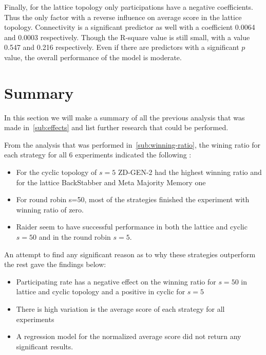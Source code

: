 Finally, for the lattice topology only participations have a negative coefficients.
Thus the only factor with a reverse influence on average score in the lattice topology.
Connectivity is a significant predictor as well with a coefficient 0.0064 and
0.0003 respectively. Though the R-square value is still  small,
with a value 0.547 and 0.216 respectively.
Even if there are predictors with a significant \(p\) value, the overall
performance of the model is moderate.



\section{Summary}
\label{sub:summary}
In this section we will make a summary of all the previous analysis that was made
in~\ref{sub:effects} and list further research that could be performed.

From the analysis that was performed in~\ref{sub:winning-ratio}, the wining ratio
for each strategy for all 6 experiments indicated the following :

\begin{itemize}
  \item For the cyclic topology of \(s=5\) ZD-GEN-2 had the highest winning ratio
        and for the lattice BackStabber and Meta Majority Memory one
  \item For round robin s=50, most of the strategies finished the experiment
        with winning ratio of zero.
  \item Raider seem to have successful performance in both the lattice and cyclic \(s=50\)
        and in the round robin \(s=5\).
\end{itemize}

An attempt to find any significant reason as to why these strategies outperform
the rest gave the findings below:

\begin{itemize}
  \item Participating rate has a negative effect on the winning ratio for \(s=50\)
        in lattice and cyclic topology and a positive in cyclic for \(s=5\)
  \item There is high variation is the average score of each strategy for all
        experiments
  \item A regression model for the normalized average score did not return any
        significant results.
\end{itemize}


